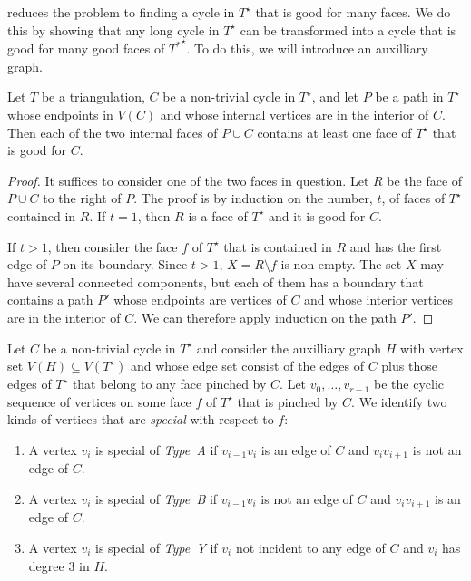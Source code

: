 \documentclass{patmorin}
\newcommand{\dual}[1]{{#1}^\star}
\begin{document}
 reduces the problem to finding a cycle in
$\dual{T}$ that is good for many faces.  We do this by showing that any
long cycle in $\dual{T}$ can be transformed into a cycle that is good
for many good faces of $\dual{T^*}$.  To do this, we will introduce an
auxilliary graph.

\begin{lem}
   Let $T$ be a triangulation, $C$ be a non-trivial cycle in $\dual{T}$,
   and let $P$ be a path in $\dual{T}$ whose endpoints in $V(C)$ and whose
   internal vertices are in the interior of $C$.  Then each of the two
   internal faces of $P\cup C$ contains at least one face of $\dual{T}$
   that is good for $C$.
\end{lem}

\begin{proof}
   It suffices to consider one of the two faces in question. Let $R$
   be the face of $P\cup C$ to the right of $P$.  The proof
   is by induction on the number, $t$, of faces of $\dual{T}$ contained
   in $R$.  If $t=1$, then $R$ is a face of $\dual{T}$ and it is good
   for $C$.

   If $t>1$, then consider the face $f$ of $\dual{T}$ that is contained
   in $R$ and has the first edge of $P$ on its boundary.  Since $t>1$,
   $X=R\setminus f$ is non-empty. The set $X$ may have several connected
   components, but each of them has a boundary that contains a path $P'$
   whose endpoints are vertices of $C$ and whose interior vertices are
   in the interior of $C$.  We can therefore apply induction on the
   path $P'$.
\end{proof}

Let $C$ be a non-trivial cycle in $\dual{T}$ and consider the auxilliary
graph $H$ with vertex set $V(H)\subseteq V(\dual{T})$ and whose edge set
consist of the edges of $C$ plus those edges of $\dual{T}$ that belong
to any face pinched by $C$.  Let $v_0,\ldots,v_{r-1}$ be the cyclic sequence of vertices on some face $f$ of $\dual{T}$ that is pinched by $C$.  
We identify two kinds of vertices that are \emph{special} with respect to $f$:
\begin{enumerate}
  \item A vertex $v_i$ is special of \emph{Type~A} if $v_{i-1}v_i$ is an edge of $C$ and $v_iv_{i+1}$ is not an edge of $C$.
  \item A vertex $v_i$ is special of \emph{Type~B} if $v_{i-1}v_i$ is not an edge of $C$ and $v_iv_{i+1}$ is an edge of $C$.
  \item A vertex $v_i$ is special of \emph{Type~Y} if $v_i$ not incident to any edge of $C$ and $v_i$ has degree 3 in $H$.
\end{enumerate}
\end{document}
